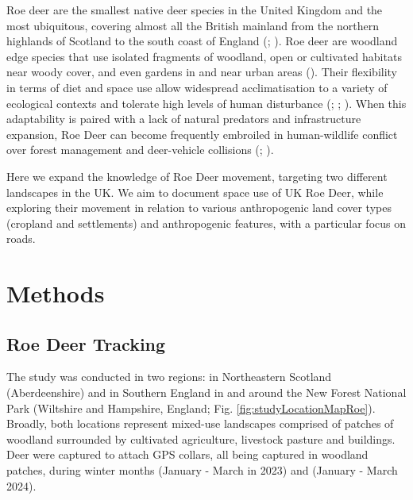 \documentclass[10pt,a4paper]{article}
\begin{document}
Roe deer are the smallest native deer species in the United Kingdom and the most ubiquitous, covering almost all the British mainland from the northern highlands of Scotland to the south coast of England (; ).
Roe deer are woodland edge species that use isolated fragments of woodland, open or cultivated habitats near woody cover, and even gardens in and near urban areas ().
Their flexibility in terms of diet and space use allow widespread acclimatisation to a variety of ecological contexts and tolerate high levels of human disturbance (; ; ).
When this adaptability is paired with a lack of natural predators and infrastructure expansion, Roe Deer can become frequently embroiled in human-wildlife conflict over forest management and deer-vehicle collisions (; ).

Here we expand the knowledge of Roe Deer movement, targeting two different landscapes in the UK.
We aim to document space use of UK Roe Deer, while exploring their movement in relation to various anthropogenic land cover types (cropland and settlements) and anthropogenic features, with a particular focus on roads.

\clearpage

\section{Methods}\label{methods}

\subsection{Roe Deer Tracking}\label{roe-deer-tracking}

The study was conducted in two regions: in Northeastern Scotland (Aberdeenshire) and in Southern England in and around the New Forest National Park (Wiltshire and Hampshire, England; Fig. \ref{fig:studyLocationMapRoe}).
Broadly, both locations represent mixed-use landscapes comprised of patches of woodland surrounded by cultivated agriculture, livestock pasture and buildings.
Deer were captured to attach GPS collars, all being captured in woodland patches, during winter months (January - March in 2023) and (January - March 2024).
\end{document}
